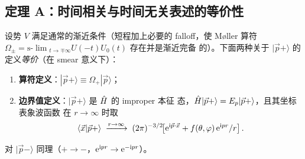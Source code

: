 \subsection{定理 A：时间相关与时间无关表述的等价性}
\label{sec:stat-proof-A}

\begin{theorem}\label{thm:stat-equiv}
设势 $V$ 满足通常的渐近条件（短程加上必要的 falloff，使 M\o ller 算符
$\Omega_\pm = \mathrm{s\text{-}\lim}_{t\to\mp\infty}U(-t)U_0(t)$ 存在并是渐近完备
的）。下面两种关于 $|\vec p+\rangle$ 的定义\emph{等价}（在 smear 意义下）：
\begin{enumerate}
  \item[(D1)] \textbf{算符定义}：$|\vec p+\rangle \equiv \Omega_+|\vec p\rangle$；
  \item[(D2)] \textbf{边界值定义}：$|\vec p+\rangle$ 是 $\hat{H}$ 的 improper 本征
              态，$\hat{H}|\vec p+\rangle = E_p|\vec p+\rangle$，且其坐标表象波函数
              在 $r\to\infty$ 时取
              \begin{equation*}
                \langle\vec x|\vec p+\rangle \;\xrightarrow{r\to\infty}\;
                (2\pi)^{-3/2}\!\big[\mathrm{e}^{\mathrm{i}\vec p\cdot\vec x}
                + f(\theta,\varphi)\,\mathrm{e}^{\mathrm{i} pr}/r\big]\,.
              \end{equation*}
\end{enumerate}
对 $|\vec p-\rangle$ 同理（$+\to-$，$\mathrm{e}^{\mathrm{i} pr}\to\mathrm{e}^{-\mathrm{i} pr}$）。
\end{theorem}

